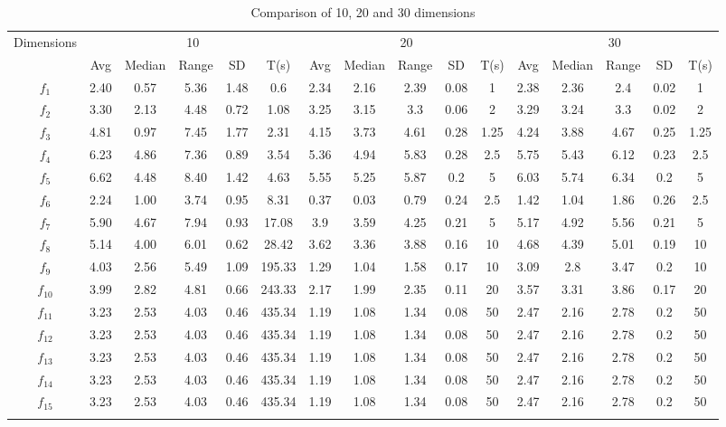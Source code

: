 \documentclass[paper=a4, fontsize=11pt]{scrartcl} %
\numberwithin{equation}{section} %
\numberwithin{figure}{section} %
\numberwithin{table}{section} %
\begin{document}
\begin{sidewaystable}
	\small
	\centering
	\caption{Comparison of 10, 20 and 30 dimensions}
	\label{Tab1}
	\begin{tabular}{c|ccccc|ccccc|ccccc}    
	\noalign{\smallskip}\hline\noalign{\smallskip}
	Dimensions 	& \multicolumn{5}{c}{10}
				& \multicolumn{5}{|c|}{20}
				& \multicolumn{5}{c}{30} \\ 
	\noalign{\smallskip}\hline\noalign{\smallskip}
		 & Avg & Median & Range & SD & T(s) 
		 & Avg & Median & Range & SD & T(s) 
		 & Avg & Median & Range & SD & T(s) \\ 
\noalign{\smallskip}\hline\noalign{\smallskip}
			$f_1$ & 2.40 & 0.57 & 5.36 & 1.48 & 0.6 & 2.34 & 2.16 & 2.39 & 0.08 & 1 & 2.38 & 2.36 & 2.4 & 0.02 & 1 \\ 
			$f_2$ & 3.30 & 2.13 & 4.48 & 0.72 & 1.08 & 3.25 & 3.15 & 3.3 & 0.06 & 2 & 3.29 & 3.24 & 3.3 & 0.02 & 2 \\ 
			$f_3$ & 4.81 & 0.97 & 7.45 & 1.77 & 2.31 & 4.15 & 3.73 & 4.61 & 0.28 & 1.25 & 4.24 & 3.88 & 4.67 & 0.25 & 1.25 \\ 
			$f_4$ & 6.23 & 4.86 & 7.36 & 0.89 & 3.54 & 5.36 & 4.94 & 5.83 & 0.28 & 2.5 & 5.75 & 5.43 & 6.12 & 0.23 & 2.5 \\ 
			$f_5$ & 6.62 & 4.48 & 8.40 & 1.42 & 4.63 & 5.55 & 5.25 & 5.87 & 0.2 & 5 & 6.03 & 5.74 & 6.34 & 0.2 & 5 \\ 
			$f_6$ & 2.24 & 1.00 & 3.74 & 0.95 & 8.31 & 0.37 & 0.03 & 0.79 & 0.24 & 2.5 & 1.42 & 1.04 & 1.86 & 0.26 & 2.5 \\ 
			$f_7$ & 5.90 & 4.67 & 7.94 & 0.93 & 17.08 & 3.9 & 3.59 & 4.25 & 0.21 & 5 & 5.17 & 4.92 & 5.56 & 0.21 & 5 \\ 
			$f_8$ & 5.14 & 4.00 & 6.01 & 0.62 & 28.42 & 3.62 & 3.36 & 3.88 & 0.16 & 10 & 4.68 & 4.39 & 5.01 & 0.19 & 10 \\ 
			$f_9$ & 4.03 & 2.56 & 5.49 & 1.09 & 195.33 & 1.29 & 1.04 & 1.58 & 0.17 & 10 & 3.09 & 2.8 & 3.47 & 0.2 & 10 \\ 
			$f_{10}$ & 3.99 & 2.82 & 4.81 & 0.66 & 243.33 & 2.17 & 1.99 & 2.35 & 0.11 & 20 & 3.57 & 3.31 & 3.86 & 0.17 & 20 \\ 
			$f_{11}$ & 3.23 & 2.53 & 4.03 & 0.46 & 435.34 & 1.19 & 1.08 & 1.34 & 0.08 & 50 & 2.47 & 2.16 & 2.78 & 0.2 & 50 \\ 
			$f_{12}$ & 3.23 & 2.53 & 4.03 & 0.46 & 435.34 & 1.19 & 1.08 & 1.34 & 0.08 & 50 & 2.47 & 2.16 & 2.78 & 0.2 & 50 \\ 
			$f_{13}$ & 3.23 & 2.53 & 4.03 & 0.46 & 435.34 & 1.19 & 1.08 & 1.34 & 0.08 & 50 & 2.47 & 2.16 & 2.78 & 0.2 & 50 \\ 
			$f_{14}$ & 3.23 & 2.53 & 4.03 & 0.46 & 435.34 & 1.19 & 1.08 & 1.34 & 0.08 & 50 & 2.47 & 2.16 & 2.78 & 0.2 & 50 \\ 
			$f_{15}$ & 3.23 & 2.53 & 4.03 & 0.46 & 435.34 & 1.19 & 1.08 & 1.34 & 0.08 & 50 & 2.47 & 2.16 & 2.78 & 0.2 & 50 \\ 
\noalign{\smallskip}\hline\noalign{\smallskip}

	\end{tabular}
\end{sidewaystable}
\end{document}
